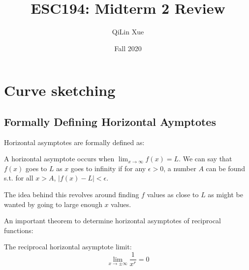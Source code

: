 \documentclass{article}
\title{ESC194: Midterm 2 Review}
\author{QiLin Xue}
\date{Fall 2020}
\begin{document}
\maketitle
\tableofcontents
\printindex

\newpage
\section{Curve sketching}
\subsection{Formally Defining Horizontal Aymptotes}
Horizontal asymptotes are formally defined as:
\begin{definition}
    A horizontal asymptote occurs when $\lim_{x\to\infty}f(x)=L$. We can say that 
    $f(x)$ goes to $L$ as $x$ goes to infinity if for any $\epsilon>0$, a number $A$ can be found s.t. for all $x>A$, $|f(x)-L|<\epsilon$.
    \vspace{2mm}

    The idea behind this revolves around finding $f$ values as close to $L$ as might be wanted by going to large enough $x$ values.
\end{definition}
An important theorem to determine horizontal asymptotes of reciprocal functions:
\begin{theorem}
    The reciprocal horizontal asymptote limit:
    \begin{equation}
        \lim_{x\to \pm \infty} \frac{1}{x^r} = 0
        \label{eq:}
    \end{equation}
\end{theorem}
\end{document}

